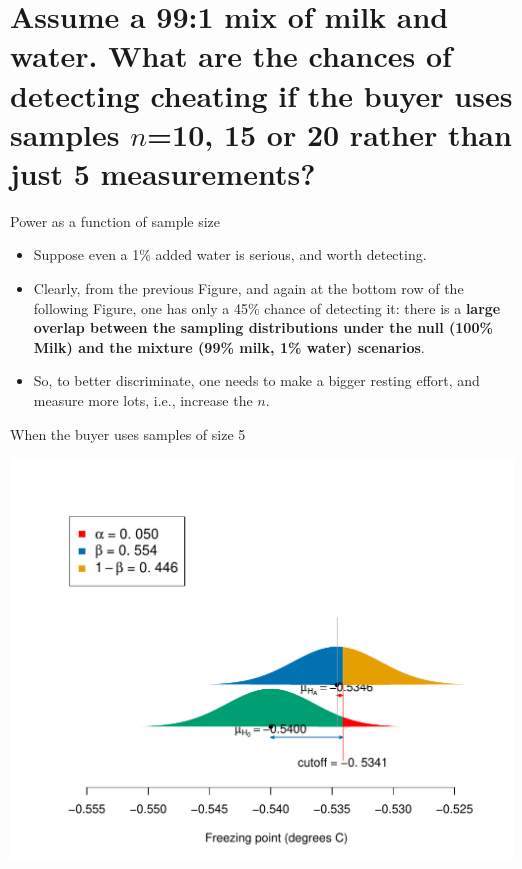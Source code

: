\documentclass[10pt,handout]{beamer}\usepackage[]{graphicx}\usepackage[]{color}
\makeatletter
\def\maxwidth{ %
  \ifdim\Gin@nat@width>\linewidth
    \linewidth
  \else
    \Gin@nat@width
  \fi
}
\newenvironment{knitrout}{}{} %
\makeatother
\begin{document}
\section{Assume a 99:1 mix of milk and water. What are the chances of detecting cheating if the buyer uses samples $n$=10, 15 or 20 rather than just 5 measurements?}

\begin{frame}{Power as a function of sample size}
	
	\begin{itemize}
		\setlength\itemsep{1em}
		\item Suppose even a 1\% added water is serious, and worth detecting.
		\item Clearly, from the previous Figure, and again at the bottom row of the following Figure,
		one has only a 45\% chance of detecting it: there is a \textbf{large overlap between the sampling distributions under the null (100\% Milk) and the mixture (99\% milk, 1\% water) scenarios}. \pause 
		
		\item So, to better discriminate, one needs to make a bigger resting effort, and measure more lots,
		i.e., increase the $n$.
	\end{itemize}
\end{frame}


\begin{frame}[fragile]{When the buyer uses samples of size 5}

	
	
\begin{knitrout}\tiny
{}\color{fgcolor}

{\centering \includegraphics[width=\maxwidth]{figure/unnamed-chunk-11-1} 

}



\end{knitrout}
\end{frame}
\end{document}
